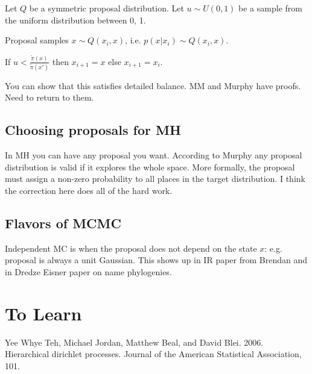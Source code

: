 \documentclass[12pt]{amsart}
\begin{document}
Let $Q$ be a symmetric proposal distribution. Let $u \sim U(0,1)$ be a sample from the uniform distribution between 0, 1.

Proposal samples $x \sim Q(x_i, x)$, i.e. $p(x | x_i) \sim Q(x_i, x)$. 

If $u < \frac{\widetilde{\pi}(x)}{\widetilde{\pi}(x')}$ then $x_{i+1} = x$ else $x_{i+ 1} = x_i$.

You can show that this satisfies detailed balance. MM and Murphy have proofs. Need to return to them.

\subsection{Choosing proposals for MH}
In MH you can have any proposal you want. According to Murphy any proposal distribution is valid if it explores the whole space. More formally, the proposal must assign a non-zero probability to all places in the target distribution. I think the correction here does all of the hard work.

\subsection{Flavors of MCMC}
Independent MC is when the proposal does not depend on the state $x$: e.g. proposal is always a unit Gaussian. This shows up in IR paper from Brendan and in Dredze Eisner paper on name phylogenies. 

\section{To Learn}
Yee Whye Teh, Michael Jordan, Matthew Beal, and David Blei.
2006. Hierarchical dirichlet processes. Journal of the American Statistical Association, 101.
\end{document}
